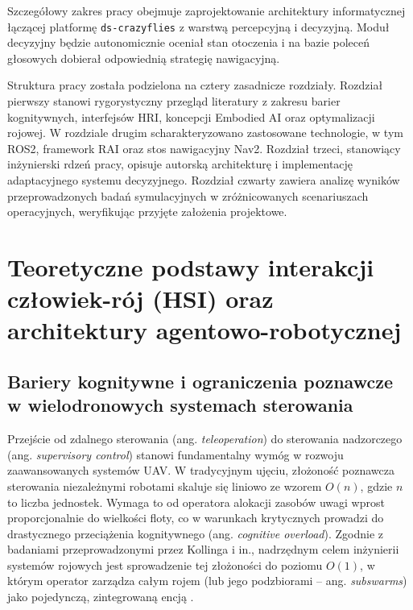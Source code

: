 \documentclass[12pt,a4paper,twoside]{report}
\theoremstyle{definition} %
\begin{document}
Szczegółowy zakres pracy obejmuje zaprojektowanie architektury informatycznej łączącej platformę \texttt{ds-crazyflies} z warstwą percepcyjną i decyzyjną. Moduł decyzyjny będzie autonomicznie oceniał stan otoczenia i na bazie poleceń głosowych dobierał odpowiednią strategię nawigacyjną. 

Struktura pracy została podzielona na cztery zasadnicze rozdziały. Rozdział pierwszy stanowi rygorystyczny przegląd literatury z zakresu barier kognitywnych, interfejsów HRI, koncepcji Embodied AI oraz optymalizacji rojowej. W rozdziale drugim scharakteryzowano zastosowane technologie, w tym ROS2, framework RAI oraz stos nawigacyjny Nav2. Rozdział trzeci, stanowiący inżynierski rdzeń pracy, opisuje autorską architekturę i implementację adaptacyjnego systemu decyzyjnego. Rozdział czwarty zawiera analizę wyników przeprowadzonych badań symulacyjnych w zróżnicowanych scenariuszach operacyjnych, weryfikując przyjęte założenia projektowe.

\cleardoublepage
\chapter{Teoretyczne podstawy interakcji człowiek-rój (HSI) oraz architektury agentowo-robotycznej}

\section{Bariery kognitywne i ograniczenia poznawcze w wielodronowych systemach sterowania}
Przejście od zdalnego sterowania (ang. \textit{teleoperation}) do sterowania nadzorczego (ang. \textit{supervisory control}) stanowi fundamentalny wymóg w rozwoju zaawansowanych systemów UAV. W tradycyjnym ujęciu, złożoność poznawcza sterowania niezależnymi robotami skaluje się liniowo ze wzorem $O(n)$, gdzie $n$ to liczba jednostek. Wymaga to od operatora alokacji zasobów uwagi wprost proporcjonalnie do wielkości floty, co w warunkach krytycznych prowadzi do drastycznego przeciążenia kognitywnego (ang. \textit{cognitive overload}). Zgodnie z badaniami przeprowadzonymi przez Kollinga i in., nadrzędnym celem inżynierii systemów rojowych jest sprowadzenie tej złożoności do poziomu $O(1)$, w którym operator zarządza całym rojem (lub jego podzbiorami -- ang. \textit{subswarms}) jako pojedynczą, zintegrowaną encją \cite{kolling2016}.
\end{document}

